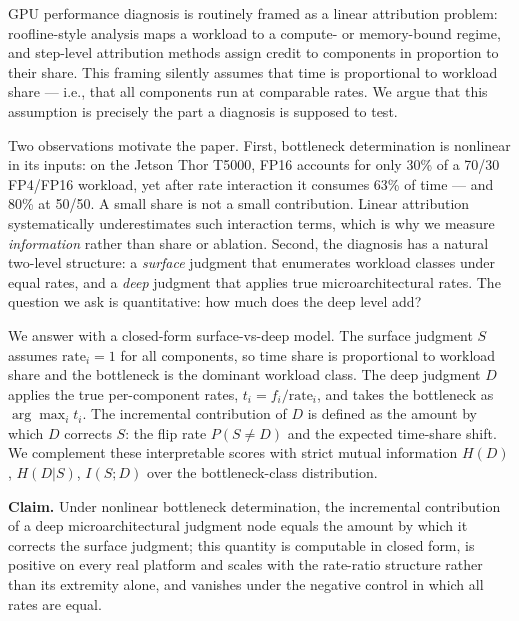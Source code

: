 GPU performance diagnosis is routinely framed as a linear attribution problem: roofline-style analysis maps a workload to a compute- or memory-bound regime, and step-level attribution methods assign credit to components in proportion to their share. This framing silently assumes that time is proportional to workload share --- i.e., that all components run at comparable rates. We argue that this assumption is precisely the part a diagnosis is supposed to test.

Two observations motivate the paper. First, bottleneck determination is nonlinear in its inputs: on the Jetson Thor T5000, FP16 accounts for only 30\% of a 70/30 FP4/FP16 workload, yet after rate interaction it consumes 63\% of time --- and 80\% at 50/50. A small share is not a small contribution. Linear attribution systematically underestimates such interaction terms, which is why we measure \emph{information} rather than share or ablation. Second, the diagnosis has a natural two-level structure: a \emph{surface} judgment that enumerates workload classes under equal rates, and a \emph{deep} judgment that applies true microarchitectural rates. The question we ask is quantitative: how much does the deep level add?

We answer with a closed-form surface-vs-deep model. The surface judgment \(S\) assumes \(\text{rate}_i = 1\) for all components, so time share is proportional to workload share and the bottleneck is the dominant workload class. The deep judgment \(D\) applies the true per-component rates, \(t_i = f_i / \text{rate}_i\), and takes the bottleneck as \(\arg\max_i t_i\). The incremental contribution of \(D\) is defined as the amount by which \(D\) corrects \(S\): the flip rate \(P(S \neq D)\) and the expected time-share shift. We complement these interpretable scores with strict mutual information \(H(D)\), \(H(D|S)\), \(I(S;D)\) over the bottleneck-class distribution.

\textbf{Claim.} Under nonlinear bottleneck determination, the incremental contribution of a deep microarchitectural judgment node equals the amount by which it corrects the surface judgment; this quantity is computable in closed form, is positive on every real platform and scales with the rate-ratio structure rather than its extremity alone, and vanishes under the negative control in which all rates are equal.

